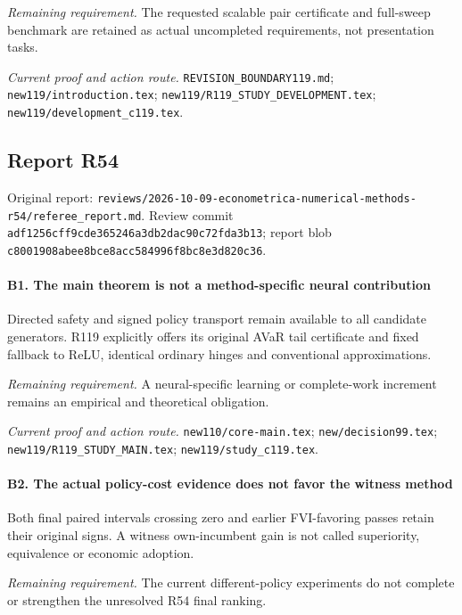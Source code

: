 \par\emph{Remaining requirement.} The requested scalable pair certificate and full-sweep benchmark are retained as actual uncompleted requirements, not presentation tasks.

\par\emph{Current proof and action route.} \nolinkurl{REVISION_BOUNDARY119.md}; \nolinkurl{new119/introduction.tex}; \nolinkurl{new119/R119_STUDY_DEVELOPMENT.tex}; \nolinkurl{new119/development_c119.tex}.

\subsection{Report R54}

Original report: \nolinkurl{reviews/2026-10-09-econometrica-numerical-methods-r54/referee_report.md}. Review commit \nolinkurl{adf1256cff9cde365246a3db2dac90c72fda3b13}; report blob \nolinkurl{c8001908abee8bce8acc584996f8bc8e3d820c36}.

\paragraph{B1. The main theorem is not a method-specific neural contribution}

Directed safety and signed policy transport remain available to all candidate generators. R119 explicitly offers its original AVaR tail certificate and fixed fallback to ReLU, identical ordinary hinges and conventional approximations.

\par\emph{Remaining requirement.} A neural-specific learning or complete-work increment remains an empirical and theoretical obligation.

\par\emph{Current proof and action route.} \nolinkurl{new110/core-main.tex}; \nolinkurl{new/decision99.tex}; \nolinkurl{new119/R119_STUDY_MAIN.tex}; \nolinkurl{new119/study_c119.tex}.

\paragraph{B2. The actual policy-cost evidence does not favor the witness method}

Both final paired intervals crossing zero and earlier FVI-favoring passes retain their original signs. A witness own-incumbent gain is not called superiority, equivalence or economic adoption.

\par\emph{Remaining requirement.} The current different-policy experiments do not complete or strengthen the unresolved R54 final ranking.

